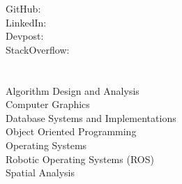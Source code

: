 \documentclass[]{hackathons}
\begin{document}
\begin{minipage}[t]{0.32\textwidth} 


GitHub: \href{https://github.com/adriandarian}{} \\
LinkedIn: \href{https://www.linkedin.com/in/adriandarian}{} \\
Devpost: \href{https://www.devpost.com/adarian}{} \\
StackOverflow: \href{https://stackoverflow.com/users/9647369/adarian}{} \\


\section{}

\small


\section{}
Algorithm Design and Analysis \\
Computer Graphics \\
Database Systems and Implementations \\
Object Oriented Programming \\
Operating Systems \\
Robotic Operating Systems (ROS) \\
Spatial Analysis \\
\small



\end{minipage}
\end{document}
